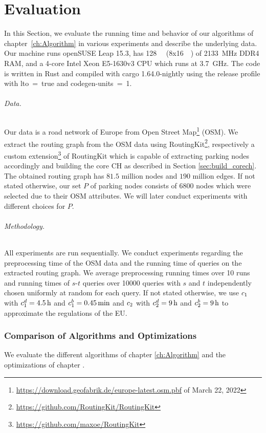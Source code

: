 
\chapter{Evaluation\label{ch:Evaluation}}
In this Section, we evaluate the running time and behavior of our algorithms of chapter~\ref{ch:Algorithm} in various experiments and describe the underlying data. Our machine runs openSUSE Leap 15.3, has \SI{128}{\giga\byte} (8x\SI{16}{\giga\byte}) of \SI{2133}{\mega\hertz} DDR4 RAM, and a 4-core Intel Xeon E5-1630v3 CPU which runs at \SI{3.7}{\giga\hertz}. The code is written in Rust and compiled with cargo 1.64.0-nightly using the release profile with lto~=~true and codegen-units~=~1.

\subparagraph{Data.} Our data is a road network of Europe from Open Street Map\footnote{\url{https://download.geofabrik.de/europe-latest.osm.pbf} of March 22, 2022} (OSM). We extract the routing graph from the OSM data using RoutingKit\footnote{\url{https://github.com/RoutingKit/RoutingKit}}, respectively a custom extension\footnote{\url{https://github.com/maxoe/RoutingKit}} of RoutingKit which is capable of extracting parking nodes accordingly and building the core CH as described in Section \ref{sec:build_corech}. The obtained routing graph has $81.5$ million nodes and $190$ million edges. If not stated otherwise, our set $P$ of parking nodes consists of 6800 nodes which were selected due to their OSM attributes. We will later conduct experiments with different choices for $P$.

\subparagraph{Methodology.} All experiments are run sequentially. We conduct experiments regarding the preprocessing time of the OSM data and the running time of queries on the extracted routing graph. We average preprocessing running times over \num{10} runs and running times of $s$-$t$ queries over \num{10000} queries with $s$ and $t$ independently chosen uniformly at random for each query. If not stated otherwise, we use $c_1$ with $c_1^d = \SI{4.5}{\hour}$ and $c_1^b = \SI{0.45}{\minute}$ and $c_2$ with $c_2^d = \SI{9}{\hour}$ and $c_2^b = \SI{9}{\hour}$ to approximate the regulations of the EU.

\subsection{Comparison of Algorithms and Optimizations}
We evaluate the different algorithms of chapter \ref{ch:Algorithm} and the optimizations of chapter .

